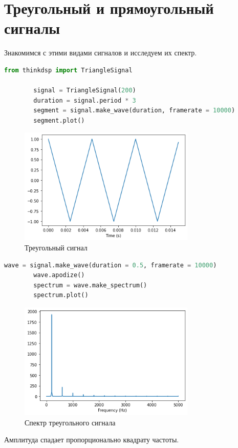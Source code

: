 \documentclass[a4paper, 12pt]{report}
\begin{document}
	\chapter{Треугольный и прямоугольный сигналы}
	Знакомимся с этими видами сигналов и исследуем их спектр.
	\begin{lstlisting}[language=Python,caption=Построение треугольного сигнала]
		from thinkdsp import TriangleSignal

		signal = TriangleSignal(200)
		duration = signal.period * 3
		segment = signal.make_wave(duration, framerate = 10000)
		segment.plot()
	\end{lstlisting}
	\begin{figure}[H]
		\centering
		\includegraphics[width=0.75\textwidth]{tri_segment.png}
		\caption{Треугольный сигнал}
		\label{fig:tri_segment}
	\end{figure}
	\begin{lstlisting}[language=Python,caption=Построение спектра сигнала]
		wave = signal.make_wave(duration = 0.5, framerate = 10000)
		wave.apodize()
		spectrum = wave.make_spectrum()
		spectrum.plot()
	\end{lstlisting}
	\begin{figure}[H]
		\centering
		\includegraphics[width=0.75\textwidth]{tri_spectrum.png}
		\caption{Спектр треугольного сигнала}
		\label{fig:tri_spectrum}
	\end{figure}
	Амплитуда спадает пропорционально квадрату частоты.
\end{document}
